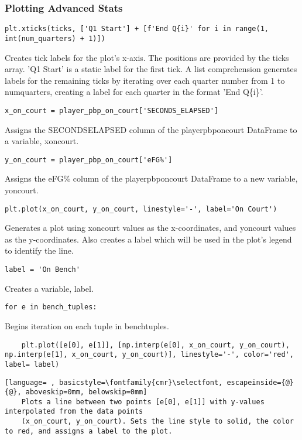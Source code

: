 \documentclass{article}
\begin{document}
\subsubsection{Plotting Advanced Stats}
\begin{lstlisting}
plt.xticks(ticks, ['Q1 Start'] + [f'End Q{i}' for i in range(1, int(num_quarters) + 1)])
\end{lstlisting}
Creates tick labels for the plot's x-axis. The positions are provided by the ticks array. 'Q1 Start' is a static label for the first tick. A list comprehension generates labels for the remaining ticks by iterating over each quarter number from 1 to num\textunderscore quarters, creating a label for each quarter in the format 'End Q\{i\}'.
\begin{lstlisting}
x_on_court = player_pbp_on_court['SECONDS_ELAPSED']
\end{lstlisting}
Assigns the SECONDS\textunderscore ELAPSED column of the player\textunderscore pbp\textunderscore on\textunderscore court DataFrame to a variable, x\textunderscore on\textunderscore court.
\begin{lstlisting}
y_on_court = player_pbp_on_court['eFG%']
\end{lstlisting}
Assigns the eFG\% column of the player\textunderscore pbp\textunderscore on\textunderscore court DataFrame to a new variable, y\textunderscore on\textunderscore court.
\begin{lstlisting}
plt.plot(x_on_court, y_on_court, linestyle='-', label='On Court')
\end{lstlisting}
Generates a plot using x\textunderscore on\textunderscore court values as the x-coordinates, and y\textunderscore on\textunderscore court values as the y-coordinates. Also creates a label which will be used in the plot's legend to identify the line.
\begin{lstlisting}
label = 'On Bench'
\end{lstlisting}
Creates a variable, label.
\begin{lstlisting}
for e in bench_tuples:
\end{lstlisting}
Begins iteration on each tuple in bench\textunderscore tuples.
\begin{lstlisting}
    plt.plot([e[0], e[1]], [np.interp(e[0], x_on_court, y_on_court), np.interp(e[1], x_on_court, y_on_court)], linestyle='-', color='red', label= label)
\end{lstlisting}
\begin{lstlisting}[language= , basicstyle=\fontfamily{cmr}\selectfont, escapeinside={@}{@}, aboveskip=0mm, belowskip=0mm]
    Plots a line between two points [e[0], e[1]] with y-values interpolated from the data points
    (x_on_court, y_on_court). Sets the line style to solid, the color to red, and assigns a label to the plot.
\end{lstlisting}
\end{document}
